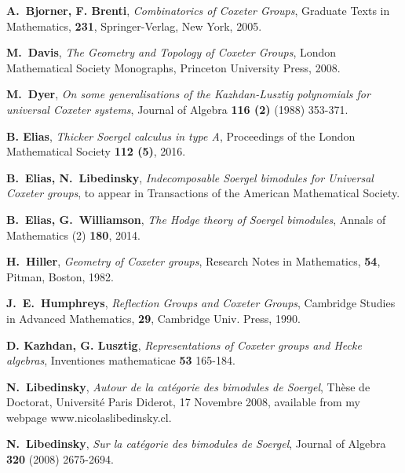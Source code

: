 \documentclass[12pt]{wart}
\theoremstyle{remark}
\begin{document}
\begin{thebibliography}{10}

 \textbf{A.~Bjorner, F. Brenti}, \emph{Combinatorics of Coxeter Groups}, Graduate Texts
in Mathematics,  \textbf{231}, Springer-Verlag, New York, 2005. 

 \textbf{M.~Davis}, \emph{The Geometry and Topology of Coxeter Groups}, London Mathematical Society
Monographs, Princeton University Press, 2008.

 \textbf{M.~Dyer}, \emph{On some generalisations of the Kazhdan-Lusztig polynomials
for universal Coxeter systems}, Journal of Algebra \textbf{116 (2)} (1988) 353-371.

 \textbf{B. Elias}, \emph{Thicker Soergel calculus in type A},  Proceedings of the London Mathematical Society  \textbf{112 (5)},  2016.

 \textbf{B.~Elias, N.~Libedinsky}, \emph{Indecomposable Soergel bimodules for Universal Coxeter groups},  to appear in Transactions of the American Mathematical Society. 

 \textbf{B.~Elias, G.~Williamson}, \emph{The Hodge theory of Soergel bimodules}, Annals of Mathematics (2) \textbf{180}, 2014.


 \textbf{H.~Hiller}, \emph{Geometry of Coxeter groups}, Research Notes in Mathematics,  \textbf{54}, Pitman, Boston, 1982. 


 \textbf{J.~E.~Humphreys}, \emph{Reflection Groups and Coxeter Groups}, Cambridge Studies in Advanced Mathematics, \textbf{29}, Cambridge Univ. Press, 1990.


 \textbf{D. Kazhdan, G. Lusztig}, \emph{Representations of Coxeter groups and Hecke algebras}, Inventiones mathematicae \textbf{53} 165-184.

 \textbf{N.~Libedinsky}, \emph{Autour de la cat\'egorie des bimodules de Soergel}, Th\`ese de Doctorat, Universit\'e Paris Diderot, 17 Novembre 2008, available from my webpage www.nicolaslibedinsky.cl.





 \textbf{N.~Libedinsky}, \emph{Sur la cat\'egorie des
 bimodules de Soergel}, Journal of Algebra \textbf{320} (2008) 2675-2694. 


\end{thebibliography}
\end{document}
